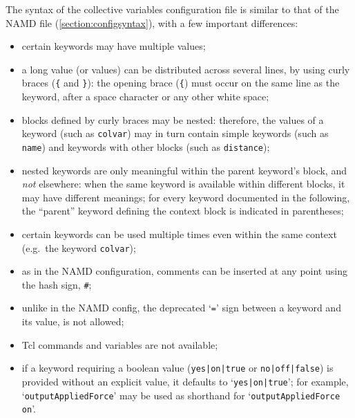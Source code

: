 The syntax of the collective variables configuration file is similar
to that of the NAMD file (\ref{section:configsyntax}), with a few
important differences:
\begin{itemize}
\item certain keywords may have multiple values;
\item a long value (or values) can be distributed across several
  lines, by using curly braces (\texttt{\{} and \texttt{\}}): the
  opening brace (\texttt{\{}) must occur on the same line as the
  keyword, after a space character or any other white space;
\item blocks defined by curly braces may be nested: therefore, the
  values of a keyword (such as \texttt{colvar}) may in turn contain
  simple keywords (such as \texttt{name}) and keywords with other
  blocks (such as \texttt{distance});
\item nested keywords are only meaningful within the parent keyword's
  block, and \emph{not} elsewhere: when the same keyword is available
  within different blocks, it may have different meanings; for every
  keyword documented in the following, the ``parent'' keyword defining
  the context block is indicated in parentheses;
\item certain keywords can be used multiple times even within the same
  context (e.g.~the keyword \texttt{colvar});
\item as in the NAMD configuration, comments can be inserted at any
  point using the hash sign, \texttt{\#};
\item unlike in the NAMD config, the deprecated `\texttt{=}' sign
  between a keyword and its value, is not allowed;
\item Tcl commands and variables are not available;
\item if a keyword requiring a boolean value (\texttt{yes|on|true} or
  \texttt{no|off|false}) is provided without an explicit value, it
  defaults to `\texttt{yes|on|true}'; for example,
  `\texttt{outputAppliedForce}' may be used as shorthand for
  `\texttt{outputAppliedForce on}'.
\end{itemize}

